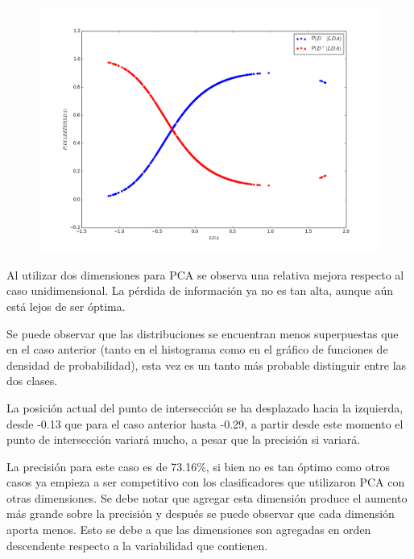 \documentclass[letter, titlepage, 10pt]{article}
\begin{document}
\begin{figure}[H]
\begin{minipage}{.5\textwidth}
    \end{minipage}
    \begin{minipage}{.5\textwidth}
        \centering
        \includegraphics[width=1\linewidth]{images/CP_D2}
    \end{minipage}
\end{figure}
Al utilizar dos dimensiones para PCA se observa una relativa mejora respecto al caso unidimensional. La pérdida de información ya no es tan alta, aunque aún está lejos de ser óptima.

Se puede observar que las distribuciones se encuentran menos superpuestas que en el caso anterior (tanto en el histograma como en el gráfico de funciones de densidad de probabilidad), esta vez es un tanto más probable distinguir entre las dos clases.

La posición actual del punto de intersección se ha desplazado hacia la izquierda, desde -0.13 que para el caso anterior hasta -0.29, a partir desde este momento el punto de intersección variará mucho, a pesar que la precisión si variará. 

La precisión para este caso es de 73.16\%, si bien no es tan óptimo como otros casos ya empieza a ser competitivo con los clasificadores que utilizaron PCA con otras dimensiones. Se debe notar que agregar esta dimensión produce el aumento más grande sobre la precisión y después se puede observar que cada dimensión aporta menos. Esto se debe a que las dimensiones son agregadas en orden descendente respecto a la variabilidad que contienen.
\end{document}
